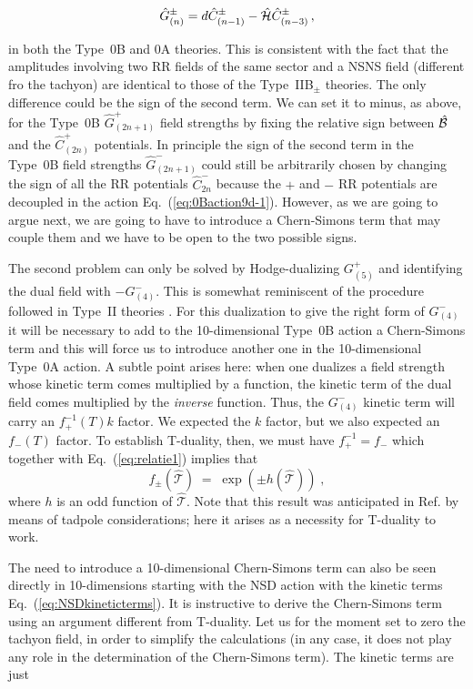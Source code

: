 \documentclass[12pt,a4paper]{article}
\begin{document}
\begin{equation}
\label{eq:RRfieldstrengths}
\hat{G}^{\pm}_{(n)} = 
d\hat{C}^{\pm}_{(n-1)} -\hat{\cal H}\hat{C}^{\pm}_{(n-3)}\, ,
\end{equation}

\noindent in both the Type~0B and 0A theories. This is consistent 
with the fact that the amplitudes involving two RR fields of the same
sector and a NSNS field (different fro the tachyon) are identical to
those of the Type~IIB$_{\pm}$ theories. The only difference could be
the sign of the second term. We can set it to minus, as above, for the
Type~0B $\hat{G}^{+}_{(2n+1)}$ field strengths by fixing the relative
sign between $\hat{\cal B}$ and the $\hat{C}^{+}_{(2n)}$ potentials.
In principle the sign of the second term in the Type~0B field
strengths $\hat{G}^{-}_{(2n+1)}$ could still be arbitrarily chosen by
changing the sign of all the RR potentials $\hat{C}^{-}_{2n}$ because
the $+$ and $-$ RR potentials are decoupled in the action
Eq.~(\ref{eq:0Baction9d-1}). However, as we are going to argue next,
we are going to have to introduce a Chern-Simons term that may couple
them and we have to be open to the two possible signs.

The second problem can only be solved by Hodge-dualizing $G^{+}_{(5)}$
and identifying the dual field with $-G^{-}_{(4)}$.  This is somewhat
reminiscent of the procedure followed in Type~II theories
\cite{kn:MO}. For this dualization to give the right form of
$G^{-}_{(4)}$ it will be necessary to add to the 10-dimensional
Type~0B action a Chern-Simons term and this will force us to introduce
another one in the 10-dimensional Type~0A action. A subtle point
arises here: when one dualizes a field strength whose kinetic term
comes multiplied by a function, the kinetic term of the dual field
comes multiplied by the {\it inverse} function. Thus, the $G^{-}_{(4)}$
kinetic term will carry an $f_{+}^{-1}(T)k$ factor. We expected the
$k$ factor, but we also expected an $f_{-}(T)$ factor. To establish
T-duality, then, we must have
$f^{-1}_{+} =f_{-}$
which together with  Eq.~(\ref{eq:relatie1}) implies that
\begin{equation}
  \label{eq:def_f}
  f_{\pm}\left(\hat{\mathcal{T}}\right) \;=\; 
       \exp\left( \pm h(\hat{\mathcal{T}})\right) \; ,
\end{equation}
where $h$ is an odd function of $\hat{\mathcal{T}}$.
Note that this result was anticipated in Ref. \cite{kn:KlTs3}
by means of tadpole considerations; here it arises as a necessity
for T-duality to work. 
\par
The need to introduce a 10-dimensional Chern-Simons term can also be
seen directly in 10-dimensions starting with the NSD action with the
kinetic terms Eq.~(\ref{eq:NSDkineticterms}). It is instructive to
derive the Chern-Simons term using an argument different from
T-duality. Let us for the moment set to zero the tachyon field, in order 
to simplify the calculations (in any case, it does not play any role in
the determination of the Chern-Simons term). The kinetic terms are
just
\end{document}
